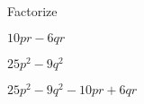 Factorize

\begin{enumx}[label=(\alph*)]
    \item $10pr - 6qr$
    \item $25p^2 - 9q^2$
    \item $25p^2 - 9q^2 - 10pr + 6qr$
\end{enumx}

